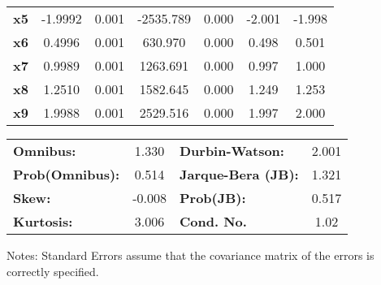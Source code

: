 \documentclass[12pt]{article}
\begin{document}
\begin{center}
\begin{tabular}{lcccccc}
\textbf{x5}    &      -1.9992  &        0.001     & -2535.789  &         0.000        &       -2.001    &       -1.998     \\
\textbf{x6}    &       0.4996  &        0.001     &   630.970  &         0.000        &        0.498    &        0.501     \\
\textbf{x7}    &       0.9989  &        0.001     &  1263.691  &         0.000        &        0.997    &        1.000     \\
\textbf{x8}    &       1.2510  &        0.001     &  1582.645  &         0.000        &        1.249    &        1.253     \\
\textbf{x9}    &       1.9988  &        0.001     &  2529.516  &         0.000        &        1.997    &        2.000     \\
\bottomrule
\end{tabular}
\begin{tabular}{lclc}
\textbf{Omnibus:}       &  1.330 & \textbf{  Durbin-Watson:     } &    2.001  \\
\textbf{Prob(Omnibus):} &  0.514 & \textbf{  Jarque-Bera (JB):  } &    1.321  \\
\textbf{Skew:}          & -0.008 & \textbf{  Prob(JB):          } &    0.517  \\
\textbf{Kurtosis:}      &  3.006 & \textbf{  Cond. No.          } &     1.02  \\
\bottomrule
\end{tabular}
\end{center}

Notes: \newline
 [1] Standard Errors assume that the covariance matrix of the errors is correctly specified.
\end{document}
